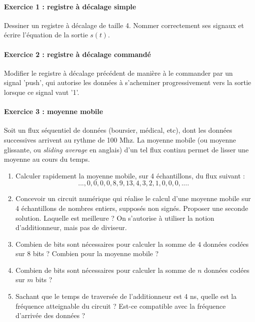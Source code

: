 \documentclass[a4paper,11pt]{article}
\begin{document}
\paragraph{Exercice 1 : registre à décalage simple} Dessiner un registre à décalage de taille 4. Nommer correctement ses signaux et écrire l'équation de la sortie $s(t)$.\\
\paragraph{Exercice 2 : registre à décalage commandé} Modifier le registre à décalage précédent de manière à le commander par un signal 'push', qui autorise les données à s'acheminer progressivement vers la sortie lorsque ce signal
vaut '1'.\\


\paragraph{Exercice 3 : moyenne mobile} Soit un flux séquentiel de données (boursier, médical, etc), dont les données successives arrivent au rythme de 100 Mhz.
La moyenne mobile (ou moyenne glissante, ou {\it sliding average} en anglais) d'un tel flux continu permet de lisser une moyenne au cours du temps.
\begin{enumerate}
  \item Calculer rapidement la moyenne mobile, sur 4 échantillons, du flux suivant : $$...,0,0,0,0,8,9,13,4,3,2,1,0,0,0,....$$
  \item Concevoir un circuit numérique qui réalise le calcul d'une moyenne mobile sur 4 échantillons de nombres entiers, supposés non signés. Proposer une seconde solution. Laquelle est meilleure ?
  On s'autorise à utiliser la notion d'additionneur, mais pas de diviseur.
  \item Combien de bits sont nécessaires pour calculer la somme de $4$ données codées sur $8$ bits ?  Combien pour la moyenne mobile ?
  \item Combien de bits sont nécessaires pour calculer la somme de $n$ données codées sur $m$ bits ?
  \item Sachant que le temps de traversée de l'additionneur est 4 ns, quelle est la fréquence atteignable du circuit ? Est-ce compatible avec la fréquence d'arrivée des données ?
\end{enumerate}
\end{document}
